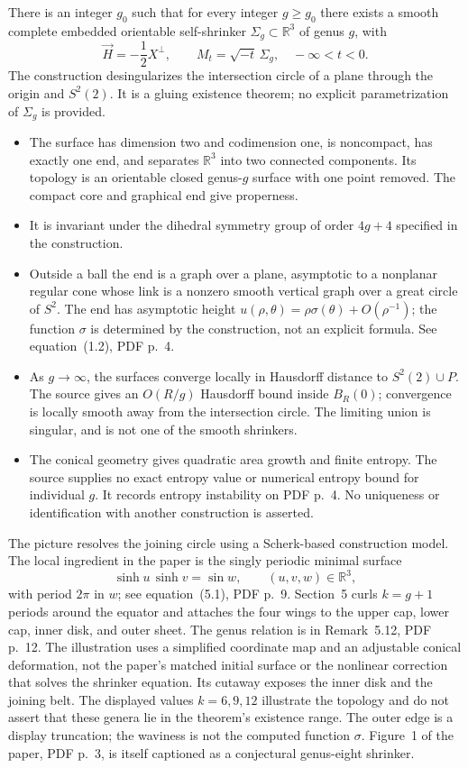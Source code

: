 \begin{example}\label{ex:catalogue-kkm-one-end}
There is an integer $g_0$ such that for every integer $g\geq g_0$ there
exists a smooth complete embedded orientable self-shrinker
$\Sigma_g\subset\mathbb R^3$ of genus $g$, with
\[
 \vec H=-\frac12X^\perp,\qquad
 M_t=\sqrt{-t}\,\Sigma_g,\quad -\infty<t<0.
\]
The construction desingularizes the intersection circle of a plane
through the origin and $S^2(2)$. It is a gluing existence theorem;
no explicit parametrization of $\Sigma_g$ is provided.
\begin{itemize}
\item The surface has dimension two and codimension one, is noncompact,
has exactly one end, and separates $\mathbb R^3$ into two connected
components. Its topology is an orientable closed genus-$g$ surface with
one point removed. The compact core and graphical end give properness.
\item It is invariant under the dihedral symmetry group of order $4g+4$
specified in the construction.
\item Outside a ball the end is a graph over a plane, asymptotic to a
nonplanar regular cone whose link is a nonzero smooth vertical graph over
a great circle of $S^2$. The end has asymptotic height
$u(\rho,\theta)=\rho\sigma(\theta)+O(\rho^{-1})$;
the function $\sigma$ is determined by the construction, not an explicit
formula. See equation~(1.2), PDF p.~4.
\item As $g\to\infty$, the surfaces converge locally in Hausdorff distance
to $S^2(2)\cup P$. The source gives an $O(R/g)$ Hausdorff bound inside
$B_R(0)$; convergence is locally smooth away from the intersection circle.
The limiting union is singular, and is not one of the smooth shrinkers.
\item The conical geometry gives quadratic area growth and finite entropy.
The source supplies no exact entropy value or numerical entropy bound
for individual $g$. It records entropy instability on PDF p.~4.
No uniqueness or identification with another construction is asserted.
\end{itemize}
The picture resolves the joining circle using a Scherk-based construction
model. The local ingredient in the paper is the singly periodic minimal
surface
\[
 \sinh u\,\sinh v=\sin w,\qquad (u,v,w)\in\mathbb R^3,
\]
with period $2\pi$ in $w$; see equation~(5.1), PDF p.~9. Section~5 curls
$k=g+1$ periods around the equator and attaches the four wings to the
upper cap, lower cap, inner disk, and outer sheet. The genus relation is
in Remark~5.12, PDF p.~12. The illustration uses a simplified coordinate
map and an adjustable conical deformation, not the paper's matched
initial surface or the nonlinear correction that solves the shrinker
equation. Its cutaway exposes the inner disk and the joining belt.
The displayed values $k=6,9,12$ illustrate the topology and do not assert
that these genera lie in the theorem's existence range. The outer edge
is a display truncation; the waviness is not the computed function
$\sigma$. Figure~1 of the paper, PDF p.~3, is itself captioned as a
conjectural genus-eight shrinker.
\end{example}

